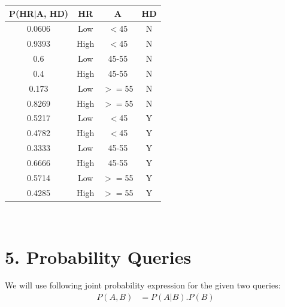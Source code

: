 \documentclass[11pt]{article} %
\begin{document}
\begin{tabular}{|c|c|c|c|}
\hline
P(HR$|$A, HD) & HR   & A      & HD \\ \hline
0.0606        & Low  & $<$45  & N  \\ \hline
0.9393        & High & $<$45  & N  \\ \hline
0.6           & Low  & 45-55 & N  \\ \hline
0.4           & High & 45-55 & N  \\ \hline
0.173         & Low  & $>=$55 & N  \\ \hline
0.8269        & High & $>=$55 & N  \\ \hline
0.5217        & Low  & $<$45 & Y  \\ \hline
0.4782        & High & $<$45 & Y  \\ \hline
0.3333        & Low  & 45-55 & Y  \\ \hline
0.6666        & High & 45-55 & Y  \\ \hline
0.5714        & Low  & $>=$55 & Y  \\ \hline
0.4285        & High & $>=$55 & Y  \\ \hline
\end{tabular}
\vspace*{1em}\\
\section*{5. Probability Queries}
We will use following joint probability expression for the given two queries:
\begin{align*}
P(A,B) &= P(A|B).P(B)
\end{align*}
\end{document}
